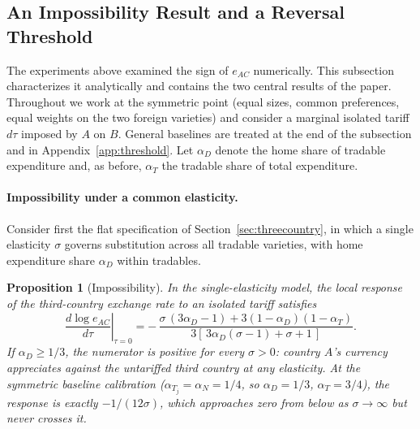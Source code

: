 \documentclass[11pt]{article}
\theoremstyle{plain}
\newtheorem{proposition}{Proposition}
\theoremstyle{remark}
\numberwithin{lemma}{section}
\numberwithin{proposition}{section}
\numberwithin{corollary}{section}
\newenvironment{revblock}{\par\begingroup\color{RevBlue}}{\endgroup\par}
\begin{document}
\begin{revblock}
\subsection{An Impossibility Result and a Reversal Threshold}
\label{sec:impossibility}

The experiments above examined the sign of $e_{AC}$ numerically. This subsection characterizes it analytically and contains the two central results of the paper. Throughout we work at the symmetric point (equal sizes, common preferences, equal weights on the two foreign varieties) and consider a marginal isolated tariff $d\tau$ imposed by $A$ on $B$. General baselines are treated at the end of the subsection and in Appendix~\ref{app:threshold}. Let $\alpha_D$ denote the home share of tradable expenditure and, as before, $\alpha_T$ the tradable share of total expenditure.

\paragraph{Impossibility under a common elasticity.} Consider first the flat specification of Section~\ref{sec:threecountry}, in which a single elasticity $\sigma$ governs substitution across all tradable varieties, with home expenditure share $\alpha_D$ within tradables.

\begin{proposition}[Impossibility]
\label{prop:impossibility}
In the single-elasticity model, the local response of the third-country exchange rate to an isolated tariff satisfies
\[
\left.\frac{d \log e_{AC}}{d\tau}\right|_{\tau=0}
= -\,\frac{\sigma\,(3\alpha_D - 1) + 3(1-\alpha_D)(1-\alpha_T)}{3\left[\,3\alpha_D(\sigma-1) + \sigma + 1\,\right]} .
\]
If $\alpha_D \ge 1/3$, the numerator is positive for every $\sigma > 0$: country $A$'s currency appreciates against the untariffed third country at any elasticity. At the symmetric baseline calibration ($\alpha_{T_j} = \alpha_N = 1/4$, so $\alpha_D = 1/3$, $\alpha_T = 3/4$), the response is exactly $-1/(12\sigma)$, which approaches zero from below as $\sigma \to \infty$ but never crosses it.
\end{proposition}


\end{revblock}
\end{document}
